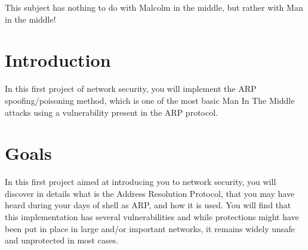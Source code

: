 \documentclass{42-en}
\begin{document}
    This subject has nothing to do with Malcolm in the middle, but rather with Man in the middle!\\
    \newpage
    
\chapter{Introduction}

    In this first project of network security, 
     you will implement the ARP spoofing/poisoning method, which is one of the most basic Man In The Middle attacks 
     using a vulnerability present in the ARP protocol.



\chapter{Goals}

    In this first project aimed at introducing you to network security,
     you will discover in details what is the Address Resolution Protocol,
      that you may have heard during your days of shell as ARP, and how it 
      is used. You will find that this implementation has several vulnerabilities 
      and while protections might have been put in place in large and/or important networks,
       it remains widely unsafe and unprotected in most cases.


\end{document}
